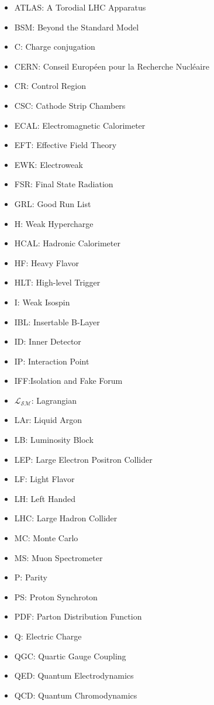 \begin{itemize}
\item{ATLAS: A Torodial LHC Apparatus}
\item{BSM: Beyond the Standard Model}
\item{C: Charge conjugation}
\item{CERN: Conseil Europ\'{e}en pour la Recherche Nucl\'{e}aire}
\item{CR: Control Region}
\item{CSC: Cathode Strip Chambers } 
\item{ECAL: Electromagnetic Calorimeter} 
\item{EFT: Effective Field Theory}
\item{EWK: Electroweak}
\item{FSR: Final State Radiation}
\item{GRL: Good Run List}
\item{H: Weak Hypercharge}
\item{HCAL: Hadronic Calorimeter}
\item{HF: Heavy Flavor}
\item{HLT: High-level Trigger} 
\item{I: Weak Isospin}
\item{IBL: Insertable B-Layer} 
\item{ID: Inner Detector} 
\item{IP: Interaction Point}
\item{IFF:Isolation and Fake Forum}
\item{$\mathcal{L_{SM}}$: Lagrangian}
\item{LAr: Liquid Argon} 
\item{LB: Luminosity Block}
\item{LEP: Large Electron Positron Collider} 
\item{LF: Light Flavor} 
\item{LH:  Left Handed}
\item{LHC: Large Hadron Collider}
\item{MC: Monte Carlo}
\item{MS: Muon Spectrometer}
\item{P: Parity}
\item{PS: Proton Synchroton}
\item{PDF: Parton Distribution Function}
\item{Q: Electric Charge}
\item{QGC: Quartic Gauge Coupling}
\item{QED: Quantum Electrodynamics}
\item{QCD: Quantum Chromodynamics}

\end{itemize}
